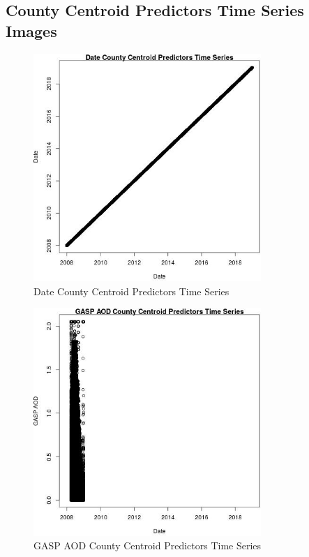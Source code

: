 
\subsection{County Centroid Predictors Time Series Images} 
 

\begin{figure} 
\centering  
\includegraphics[width=0.77\textwidth]{Code_Outputs/df_report_ML_predictors_CountyCentroid_Locations_Dates_2008-01-01to2018-12-31_DatevDate.jpg} 
\caption{\label{fig:df_report_ML_predictors_CountyCentroid_Locations_Dates_2008-01-01to2018-12-31DatevDate}Date County Centroid Predictors Time Series} 
\end{figure} 
 

\begin{figure} 
\centering  
\includegraphics[width=0.77\textwidth]{Code_Outputs/df_report_ML_predictors_CountyCentroid_Locations_Dates_2008-01-01to2018-12-31_GASP_AODvDate.jpg} 
\caption{\label{fig:df_report_ML_predictors_CountyCentroid_Locations_Dates_2008-01-01to2018-12-31GASP_AODvDate}GASP AOD County Centroid Predictors Time Series} 
\end{figure} 
 

